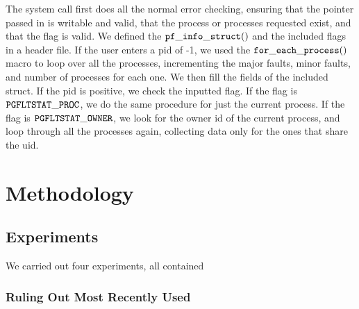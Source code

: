 \documentclass[twocolumn]{article}
\begin{document}
The system call first does all the normal error checking, ensuring that the pointer passed in is writable and valid, that the process or processes requested exist, and that the flag is valid. We defined the ${\tt pf\_info\_struct()}$ 
and the included flags in a header file.  If the user enters a pid of -1, we used the ${\tt for\_each\_process()}$ macro to loop over all the processes, incrementing the major faults, minor faults, and number of processes for each one. We then fill the fields of the included struct. If the pid is positive, we check the inputted flag. If the flag is ${\tt PGFLTSTAT\_PROC}$, we do the same procedure for just the current process. If the flag is ${\tt PGFLTSTAT\_OWNER}$, we look for the owner id of the current process, and loop through all the processes again, collecting data only for the ones that share the uid. 

\section{Methodology}
\subsection{Experiments}

We carried out four experiments, all contained 

\subsubsection{Ruling Out Most Recently Used}

\begin{figure}[h]
\end{figure}
\end{document}
